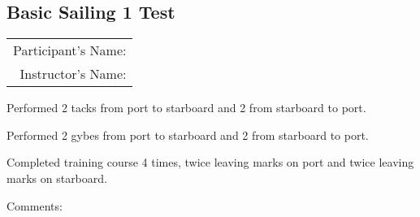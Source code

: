 \documentclass[12pt]{scrartcl}
\begin{document}
\newpage
\thispagestyle{empty}
\begin{Large}

\section{Basic Sailing 1 Test} \label{sec:test}

\begin{tabular}{r}
	Participant's Name:\\
	Instructor's Name:\\
\end{tabular}

\vspace{3cm}

\begin{test}
	\item Performed 2 tacks from port to starboard and 2 from starboard to port.
	\item Performed 2 gybes from port to starboard and 2 from starboard to port.
	\item Completed training course 4 times, twice leaving marks on port and twice leaving marks on starboard.
\end{test}

\vspace{3cm}

Comments:

\end{Large}
\end{document}
